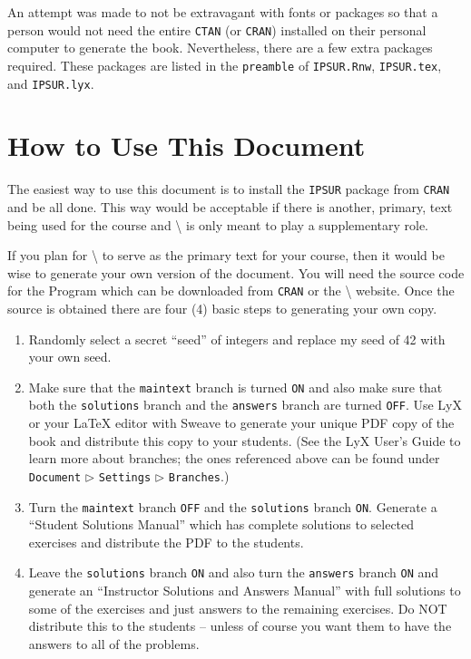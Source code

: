 \documentclass[captions=tableheading]{scrbook}
\begin{document}
\begin{example}
An attempt was made to not be extravagant with fonts or packages so that a person would not need the entire \texttt{CTAN} (or \texttt{CRAN}) installed on their personal computer to generate the book. Nevertheless, there are a few extra packages required. These packages are listed in the \texttt{preamble} of \texttt{IPSUR.Rnw}, \texttt{IPSUR.tex}, and \texttt{IPSUR.lyx}.
\section{How to Use This Document}
\label{sec-23-2}
\label{sec-How-to-Use-Document}


The easiest way to use this document is to install the \texttt{IPSUR} package from \texttt{CRAN} and be all done. This way would be acceptable if there is another, primary, text being used for the course and \IPSUR\textbackslash{} is only meant to play a supplementary role.

If you plan for \IPSUR\textbackslash{} to serve as the primary text for your course, then it would be wise to generate your own version of the document. You will need the source code for the Program which can be downloaded from \texttt{CRAN} or the \IPSUR\textbackslash{} website. Once the source is obtained there are four (4) basic steps to generating your own copy.

\begin{enumerate}
\item Randomly select a secret ``seed'' of integers and replace my seed of 42 with your own seed.
\item Make sure that the \texttt{maintext} branch is turned \texttt{ON} and also make sure that both the \texttt{solutions} branch and the \texttt{answers} branch are turned \texttt{OFF}. Use LyX or your \LaTeX{} editor with Sweave to generate your unique PDF copy of the book and distribute this copy to your students. (See the LyX User's Guide to learn more about branches; the ones referenced above can be found under \texttt{Document} \(\triangleright\) \texttt{Settings} \(\triangleright\) \texttt{Branches}.)
\item Turn the \texttt{maintext} branch \texttt{OFF} and the \texttt{solutions} branch \texttt{ON}. Generate a ``Student Solutions Manual'' which has complete solutions to selected exercises and distribute the PDF to the students.
\item Leave the \texttt{solutions} branch \texttt{ON} and also turn the \texttt{answers} branch \texttt{ON} and generate an ``Instructor Solutions and Answers Manual'' with full solutions to some of the exercises and just answers to the remaining exercises. Do NOT distribute this to the students -- unless of course you want them to have the answers to all of the problems.
\end{enumerate}


\end{example}
\end{document}
